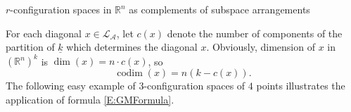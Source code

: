 \documentclass[12pt]{amsart}
\newcommand{\R}{{\mathbb R}}
\newcommand{\codim}{\operatorname{codim}}
\theoremstyle{plain}
\theoremstyle{definition}
\newtheorem{example}[thm]{Example}
\theoremstyle{remark}
\begin{document}
\begin{section}{$r$-configuration spaces in $\mathbb R^n$ as complements of subspace arrangements}
%
%
%

For each diagonal $x\in {\mathcal L}_{\mathcal A}$, let $c(x)$ denote the number of components of the partition of $\underline{k}$ which determines the diagonal $x$. Obviously, dimension of $x$ in $(\R^n)^k$ is $\dim(x)=n\cdot c(x)$, so 
\begin{equation}\label{eq: codimension}
\codim(x)=n(k-c(x)).
\end{equation}
The following easy example of $3$-configuration spaces of $4$ points illustrates the application of formula \eqref{E:GMFormula}.


\end{section}
\end{document}
